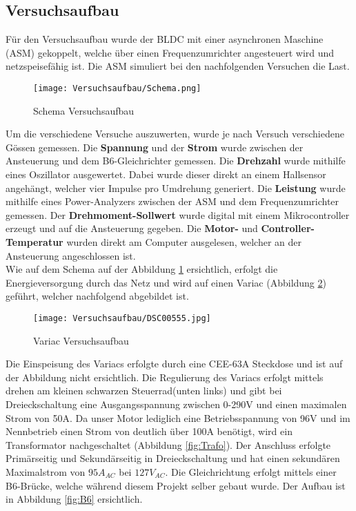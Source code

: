 \subsection{Versuchsaufbau}\label{subsec:Versuchsaufbau}
Für den Versuchsaufbau wurde der BLDC mit einer asynchronen Maschine (ASM) gekoppelt, welche über einen Frequenzumrichter angesteuert wird und netzspeisefähig ist. Die ASM simuliert bei den nachfolgenden Versuchen die Last.


\begin{figure}[H]
	\begin{center}
		\texttt{[image: Versuchsaufbau/Schema.png]}
		\caption{Schema Versuchsaufbau}
		\label{fig:Schema}
	\end{center}
\end{figure}

Um die verschiedene Versuche auszuwerten, wurde je nach Versuch verschiedene Gössen gemessen.
Die \textbf{Spannung} und der \textbf{Strom} wurde zwischen der Ansteuerung und dem B6-Gleichrichter gemessen. Die \textbf{Drehzahl} wurde mithilfe eines Oszillator ausgewertet. Dabei wurde dieser direkt an einem Hallsensor angehängt, welcher vier Impulse pro Umdrehung generiert. Die \textbf{Leistung} wurde mithilfe eines Power-Analyzers zwischen der ASM und dem Frequenzumrichter gemessen. Der \textbf{Drehmoment-Sollwert} wurde digital mit einem Mikrocontroller erzeugt und auf die Ansteuerung gegeben. Die \textbf{Motor-} und \textbf{Controller-Temperatur} wurden direkt am Computer ausgelesen, welcher an der Ansteuerung angeschlossen ist.\\

Wie auf dem Schema auf der Abbildung \ref{fig:Schema} ersichtlich, erfolgt die Energieversorgung durch das Netz und wird auf einen Variac (Abbildung \ref{fig:Variac}) geführt, welcher nachfolgend abgebildet ist.

\begin{figure}[H]
	\begin{center}
		\texttt{[image: Versuchsaufbau/DSC00555.jpg]}
		\caption[Variac Versuchsaufbau]{Variac Versuchsaufbau}
		\label{fig:Variac}
	\end{center}
\end{figure}

Die Einspeisung des Variacs erfolgte durch eine CEE-63A Steckdose und ist auf der Abbildung nicht ersichtlich. Die Regulierung des Variacs erfolgt mittels drehen am kleinen schwarzen \glqq Steuerrad\grqq \space (unten links) und gibt bei Dreieckschaltung eine Ausgangsspannung zwischen 0-290V und einen maximalen Strom von 50A. Da unser Motor lediglich eine Betriebsspannung von 96V und im Nennbetrieb einen Strom von deutlich über 100A benötigt, wird ein Transformator nachgeschaltet (Abbildung \ref{fig:Trafo}). Der Anschluss erfolgte Primärseitig und Sekundärseitig in Dreieckschaltung und hat einen sekundären Maximalstrom von $95A_{AC}$ bei $127V_{AC}$. Die Gleichrichtung erfolgt mittels einer B6-Brücke, welche während diesem Projekt selber gebaut wurde. Der Aufbau ist in Abbildung \ref{fig:B6} ersichtlich.

